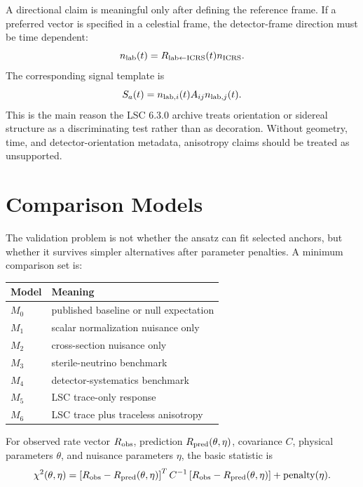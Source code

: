 \documentclass[11pt]{article}
\begin{document}
A directional claim is meaningful only after defining the reference frame.  If a
preferred vector is specified in a celestial frame, the detector-frame direction
must be time dependent:
\begin{equation}
  n_{\rm lab}(t) = R_{\rm lab \leftarrow ICRS}(t) n_{\rm ICRS}.
  \label{eq:frame}
\end{equation}
The corresponding signal template is
\begin{equation}
  S_a(t)= n_{{\rm lab},i}(t) A_{ij} n_{{\rm lab},j}(t).
  \label{eq:sidereal}
\end{equation}
This is the main reason the LSC 6.3.0 archive treats orientation or sidereal
structure as a discriminating test rather than as decoration.  Without
geometry, time, and detector-orientation metadata, anisotropy claims should be
treated as unsupported.

\section{Comparison Models}

The validation problem is not whether the ansatz can fit selected anchors, but
whether it survives simpler alternatives after parameter penalties.  A minimum
comparison set is:
\begin{center}
\begin{tabular}{ll}
\toprule
Model & Meaning \\
\midrule
$M_0$ & published baseline or null expectation \\
$M_1$ & scalar normalization nuisance only \\
$M_2$ & cross-section nuisance only \\
$M_3$ & sterile-neutrino benchmark \\
$M_4$ & detector-systematics benchmark \\
$M_5$ & LSC trace-only response \\
$M_6$ & LSC trace plus traceless anisotropy \\
\bottomrule
\end{tabular}
\end{center}

For observed rate vector $R_{\rm obs}$, prediction $R_{\rm pred}(\theta,\eta)$,
covariance $C$, physical parameters $\theta$, and nuisance parameters $\eta$,
the basic statistic is
\begin{equation}
  \chi^2(\theta,\eta)=
  \left[R_{\rm obs}-R_{\rm pred}(\theta,\eta)\right]^T
  C^{-1}
  \left[R_{\rm obs}-R_{\rm pred}(\theta,\eta)\right]
  + {\rm penalty}(\eta).
  \label{eq:chi2}
\end{equation}
\end{document}
